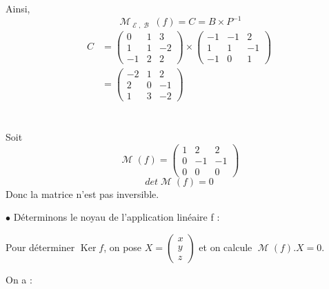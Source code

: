 \documentclass[a4paper,12pt]{article}
\DeclareMathOperator{\Ker}{Ker}
\DeclareMathOperator{\M}{\mathcal{M}}
\DeclareMathOperator{\B}{\mathcal{B}}
\DeclareMathOperator{\E}{\mathcal{E}}
\begin{document}
Ainsi,
\[
\M_{\E,\B}(f)=C=B\times P^{-1}
\]
\begin{align*}
    C&=\begin{pmatrix}0&1&3\\1&1&-2\\-1&2&2\end{pmatrix}\times\begin{pmatrix}-1&-1&2\\1&1&-1\\-1&0&1\end{pmatrix}\\ 
    &=\begin{pmatrix}-2&1&2\\2&0&-1\\1&3&-2\end{pmatrix}
\end{align*}

\clearpage

\section{}
\subsubsection{}

Soit
$$\M(f)=\begin{pmatrix}1&2&2\\0&-1&-1\\0&0&0\end{pmatrix}$$
$$det\M(f)=0$$
Donc la matrice n'est pas inversible.

$\bullet$ Déterminons le noyau de l'application linéaire f :

Pour déterminer $\Ker f$, on pose $X=\begin{pmatrix}x\\y\\z\end{pmatrix}$ et on calcule $\M(f).X=0$.

On a :
\end{document}
